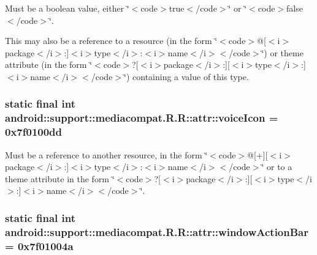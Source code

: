 Must be a boolean value, either \char`\"{}$<$code$>$true$<$/code$>$\char`\"{} or \char`\"{}$<$code$>$false$<$/code$>$\char`\"{}. 

This may also be a reference to a resource (in the form \char`\"{}$<$code$>$@\mbox{[}$<$i$>$package$<$/i$>$:\mbox{]}$<$i$>$type$<$/i$>$:$<$i$>$name$<$/i$>$$<$/code$>$\char`\"{}) or theme attribute (in the form \char`\"{}$<$code$>$?\mbox{[}$<$i$>$package$<$/i$>$:\mbox{]}\mbox{[}$<$i$>$type$<$/i$>$:\mbox{]}$<$i$>$name$<$/i$>$$<$/code$>$\char`\"{}) containing a value of this type. \hypertarget{classandroid_1_1support_1_1mediacompat_1_1_r_1_1attr_de49fa1fb1dae74c9a622f86fd5f4cde}{
\subsubsection[{voiceIcon}]{\setlength{\rightskip}{0pt plus 5cm}static final int android::support::mediacompat.R.R::attr::voiceIcon = 0x7f0100dd}}
\label{classandroid_1_1support_1_1mediacompat_1_1_r_1_1attr_de49fa1fb1dae74c9a622f86fd5f4cde}


Must be a reference to another resource, in the form \char`\"{}$<$code$>$@\mbox{[}+\mbox{]}\mbox{[}$<$i$>$package$<$/i$>$:\mbox{]}$<$i$>$type$<$/i$>$:$<$i$>$name$<$/i$>$$<$/code$>$\char`\"{} or to a theme attribute in the form \char`\"{}$<$code$>$?\mbox{[}$<$i$>$package$<$/i$>$:\mbox{]}\mbox{[}$<$i$>$type$<$/i$>$:\mbox{]}$<$i$>$name$<$/i$>$$<$/code$>$\char`\"{}. \hypertarget{classandroid_1_1support_1_1mediacompat_1_1_r_1_1attr_b0a9d5d61d73fbe0ce175165e0e94865}{
\subsubsection[{windowActionBar}]{\setlength{\rightskip}{0pt plus 5cm}static final int android::support::mediacompat.R.R::attr::windowActionBar = 0x7f01004a}}
\label{classandroid_1_1support_1_1mediacompat_1_1_r_1_1attr_b0a9d5d61d73fbe0ce175165e0e94865}


